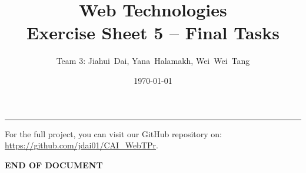 \documentclass[a4paper,12pt]{article} %
\title{Web Technologies \\
        \large{Exercise Sheet 5 -- Final Tasks}} %
\author{Team 3: Jiahui~Dai, Yana~Halamakh, Wei~Wei~Tang} %
\date{\today} %
\begin{document}
\maketitle %
\hrule %
\tableofcontents %
\newpage

For the full project, you can visit our GitHub repository on: \newline
\url{https://github.com/jdai01/CAI_WebTPr}.














\begin{center}
    \vspace{5em}
    \textbf{END OF DOCUMENT}
\end{center}
\end{document}
